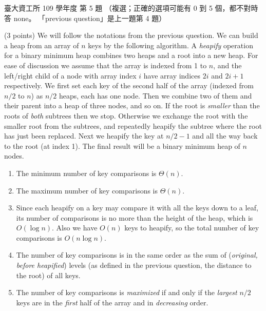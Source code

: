 \begin{pastexam}[label={px:ntu-109-dsaa-05}]{臺大資工所 109 學年度 第 5 題}
（複選；正確的選項可能有 0 到 5 個，都不對時答 none。 「previous question」是上一題第 4 題）

(3 points) We will follow the notations from the previous question. We can build a heap from an
array of $n$ keys by the following algorithm. A \textit{heapify} operation for a binary minimum
heap combines two heaps and a root into a new heap. For ease of discussion we assume that the
array is indexed from 1 to $n$, and the left/right child of a node with array index $i$ have
array indices $2i$ and $2i+1$ respectively. We first set each key of the second half of the
array (indexed from $n/2$ to $n$) as $n/2$ heaps, each has one node. Then we combine two of them
and their parent into a heap of three nodes, and so on. If the root is \textit{smaller} than the
roots of \textit{both} subtrees then we stop. Otherwise we exchange the root with the smaller
root from the subtrees, and repeatedly heapify the subtree where the root has just been
replaced. Next we heapify the key at $n/2-1$ and all the way back to the root (at index 1). The
final result will be a binary minimum heap of $n$ nodes.
\begin{enumerate}[label=\arabic*.]
\item The minimum number of key comparisons is $\Theta(n)$.
\item The maximum number of key comparisons is $\Theta(n)$.
\item Since each heapify on a key may compare it with all the keys down to a leaf, its number of
comparisons is no more than the height of the heap, which is $O(\log n)$. Also we have $O(n)$
keys to heapify, so the total number of key comparisons is $O(n\log n)$.
\item The number of key comparisons is in the same order as the sum of (\textit{original, before
heapified}) levels (as defined in the previous question, the distance to the root) of all keys.
\item The number of key comparisons is \textit{maximized} if and only if the \textit{largest}
$n/2$ keys are in the \textit{first} half of the array and in \textit{decreasing} order.
\end{enumerate}
\end{pastexam}

